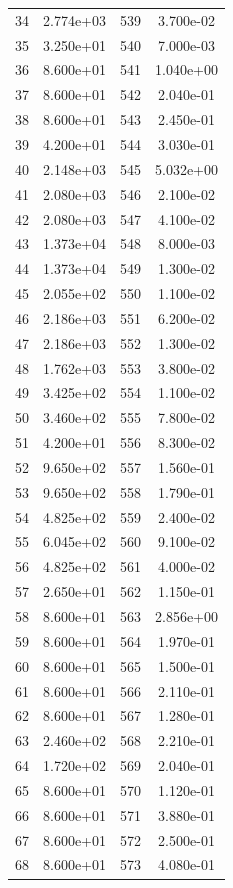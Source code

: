 \documentclass[12pt]{article}
\begin{document}
\begin{longtable}{@{}cccc@{}}
34 & 2.774e+03 & 539 & 3.700e-02 \\
35 & 3.250e+01 & 540 & 7.000e-03 \\
36 & 8.600e+01 & 541 & 1.040e+00 \\
37 & 8.600e+01 & 542 & 2.040e-01 \\
38 & 8.600e+01 & 543 & 2.450e-01 \\
39 & 4.200e+01 & 544 & 3.030e-01 \\
40 & 2.148e+03 & 545 & 5.032e+00 \\
41 & 2.080e+03 & 546 & 2.100e-02 \\
42 & 2.080e+03 & 547 & 4.100e-02 \\
43 & 1.373e+04 & 548 & 8.000e-03 \\
44 & 1.373e+04 & 549 & 1.300e-02 \\
45 & 2.055e+02 & 550 & 1.100e-02 \\
46 & 2.186e+03 & 551 & 6.200e-02 \\
47 & 2.186e+03 & 552 & 1.300e-02 \\
48 & 1.762e+03 & 553 & 3.800e-02 \\
49 & 3.425e+02 & 554 & 1.100e-02 \\
50 & 3.460e+02 & 555 & 7.800e-02 \\
51 & 4.200e+01 & 556 & 8.300e-02 \\
52 & 9.650e+02 & 557 & 1.560e-01 \\
53 & 9.650e+02 & 558 & 1.790e-01 \\
54 & 4.825e+02 & 559 & 2.400e-02 \\
55 & 6.045e+02 & 560 & 9.100e-02 \\
56 & 4.825e+02 & 561 & 4.000e-02 \\
57 & 2.650e+01 & 562 & 1.150e-01 \\
58 & 8.600e+01 & 563 & 2.856e+00 \\
59 & 8.600e+01 & 564 & 1.970e-01 \\
60 & 8.600e+01 & 565 & 1.500e-01 \\
61 & 8.600e+01 & 566 & 2.110e-01 \\
62 & 8.600e+01 & 567 & 1.280e-01 \\
63 & 2.460e+02 & 568 & 2.210e-01 \\
64 & 1.720e+02 & 569 & 2.040e-01 \\
65 & 8.600e+01 & 570 & 1.120e-01 \\
66 & 8.600e+01 & 571 & 3.880e-01 \\
67 & 8.600e+01 & 572 & 2.500e-01 \\
68 & 8.600e+01 & 573 & 4.080e-01 \\

\end{longtable}
\end{document}
